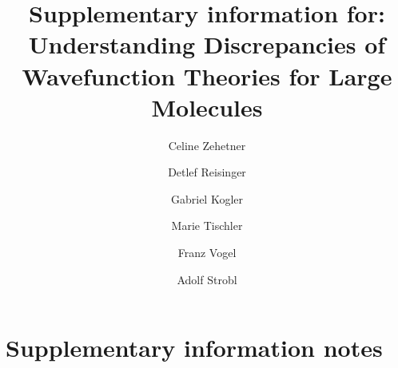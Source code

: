 \documentclass[aps,onecolumn,notitlepage]{revtex4-1}
\begin{document}
\title{Supplementary information for: Understanding Discrepancies of Wavefunction Theories for Large Molecules}
\author{Celine Zehetner}
\author{Detlef Reisinger}
\author{Gabriel Kogler}
\author{Marie Tischler}
\author{Franz Vogel}
\author{Adolf Strobl}

\maketitle
\tableofcontents


\setlength{\LTcapwidth}{\textwidth}

\renewcommand{\tablename}{Table S}
\renewcommand{\figurename}{Fig. S}
\renewcommand{\refname}{Supplementary References}
\def\thesection{S\arabic{section}}
\def\thesubsection{S(\arabic{subsection})}
\def\thesubsubsection{S(\arabic{subsubsection})}

\section{Supplementary information notes}
\end{document}
